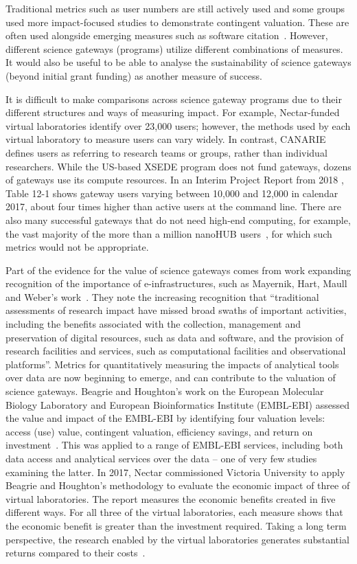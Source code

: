 \documentclass[review]{elsarticle}
\begin{document}
Traditional metrics such as user numbers are still actively used and some groups used more impact-focused studies to demonstrate contingent valuation. These are often used alongside emerging measures such as software citation~\cite{force11-32}. However, different science gateways (programs) utilize different combinations of measures. It would also be useful to be able to analyse the sustainability of science gateways (beyond initial grant funding) as another measure of success. 

It is difficult to make comparisons across science gateway programs due to their different structures and ways of measuring impact. For example, Nectar-funded virtual laboratories identify over 23,000 users; however, the methods used by each virtual laboratory to measure users can vary widely. In contrast, CANARIE defines users as referring to research teams or groups, rather than individual researchers. 
While the US-based XSEDE program does not fund gateways, dozens of gateways use its compute resources. 
In an Interim Project Report from 2018 \cite{xsede-85}, Table 12-1 shows gateway users varying between 10,000 and 12,000 in calendar 2017, about four times higher than active users at the command line.  There are also many successful gateways that do not need high-end computing, for example, the vast majority of the more than a million nanoHUB users~\cite{nanohub-33}, for which such metrics would not be appropriate.

Part of the evidence for the value of science gateways comes from work expanding recognition of the importance of e-infrastructures, such as Mayernik, Hart, Maull and Weber's work~\cite{Mayernik-34}. They note the increasing recognition that ``traditional assessments of research impact have missed broad swaths of important activities, including the benefits associated with the collection, management and preservation of digital resources, such as data and software, and the provision of research facilities and services, such as computational facilities and observational platforms''. 
Metrics for quantitatively measuring the impacts of analytical tools over data are now beginning to emerge, and can contribute to the valuation of science gateways. Beagrie and Houghton's work on the European Molecular Biology Laboratory  and European Bioinformatics Institute (EMBL-EBI) assessed the value and impact of the EMBL-EBI by identifying four valuation levels: access (use) value, contingent valuation, efficiency savings, and return on investment~\cite{Beagrie2016-35}. 
This was applied to a range of EMBL-EBI services, including both data access and analytical services over the data – one of very few studies examining the latter. In 2017, Nectar commissioned Victoria University to apply Beagrie and Houghton's methodology to evaluate the economic impact of three of virtual laboratories. The report measures the economic benefits created in five different ways. For all three of the virtual laboratories, each measure shows that the economic benefit is greater than the investment required.  Taking a long term perspective, the research enabled by the virtual laboratories generates substantial returns compared to their costs~\cite{nectar-80}.
\end{document}
